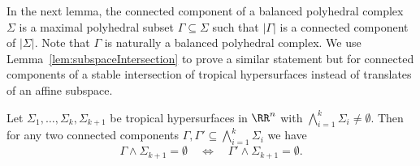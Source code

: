 In the next lemma, the connected component of a balanced polyhedral complex $\Sigma$ is a maximal polyhedral subset  $\Gamma\subseteq\Sigma$ such that $|\Gamma|$ is a connected component of $|\Sigma|$.  Note that $\Gamma$ is naturally a balanced polyhedral complex.  We use Lemma~\ref{lem:subspaceIntersection} to prove a similar statement but for connected components of a stable intersection of tropical hypersurfaces instead of translates of an affine subspace.

\begin{lemma}\label{lem:stableConspiracy}
  Let $\Sigma_1,\dots,\Sigma_k,\Sigma_{k+1}$ be tropical hypersurfaces in $\RR^n$ with $\bigwedge_{i=1}^k\Sigma_i\neq\emptyset$. Then for any two connected components $\Gamma,\Gamma'\subseteq \bigwedge_{i=1}^k\Sigma_i$ we have
  \[ \Gamma\wedge\Sigma_{k+1}=\emptyset \quad\Longleftrightarrow\quad \Gamma'\wedge\Sigma_{k+1}=\emptyset. \]
\end{lemma}
